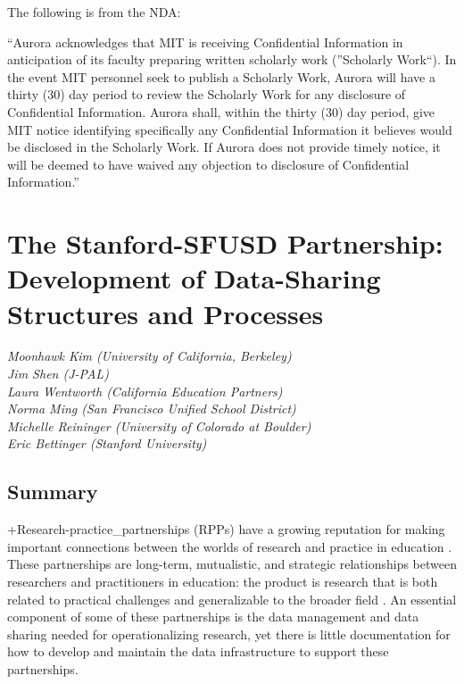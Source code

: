 \documentclass[
]{book}
\begin{document}
The following is from the NDA:

``Aurora acknowledges that MIT is receiving Confidential Information in anticipation of its faculty preparing written scholarly work (''Scholarly Work``). In the event MIT personnel seek to publish a Scholarly Work, Aurora will have a thirty (30) day period to review the Scholarly Work for any disclosure of Confidential Information. Aurora shall, within the thirty (30) day period, give MIT notice identifying specifically any Confidential Information it believes would be disclosed in the Scholarly Work. If Aurora does not provide timely notice, it will be deemed to have waived any objection to disclosure of Confidential Information.''

\hypertarget{sfusd}{%
\chapter{The Stanford-SFUSD Partnership: Development of Data-Sharing Structures and Processes}\label{sfusd}}

\emph{Moonhawk Kim (University of California, Berkeley)}\\
\emph{Jim Shen (J-PAL)}\\
\emph{Laura Wentworth (California Education Partners)}\\
\emph{Norma Ming (San Francisco Unified School District)}\\
\emph{Michelle Reininger (University of Colorado at Boulder)}\\
\emph{Eric Bettinger (Stanford University)}

\hypertarget{summary-6}{%
\section{Summary}\label{summary-6}}

+Research-practice\_partnerships\textbar{} (RPPs) have a growing reputation for making important connections between the worlds of research and practice in education \citep{farley-ripple2018, farrell2019}. These partnerships are long-term, mutualistic, and strategic relationships between researchers and practitioners in education: the product is research that is both related to practical challenges and generalizable to the broader field \citep{coburn2013, coburn2016}. An essential component of some of these partnerships is the data management and data sharing needed for operationalizing research, yet there is little documentation for how to develop and maintain the data infrastructure to support these partnerships.
\end{document}
